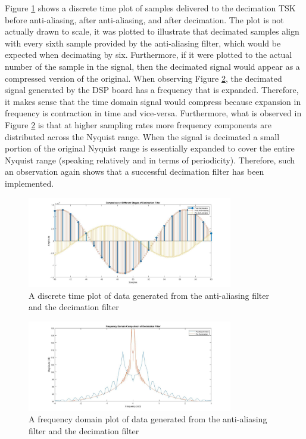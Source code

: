 \documentclass[11pt,pdftex,portrait,letterpaper]{article}
\begin{document}
Figure \ref{f:fig4} shows a discrete time plot of samples delivered to the decimation TSK before anti-aliasing, after anti-aliasing, and after decimation. The plot is not actually drawn to scale, it was plotted to illustrate that decimated samples align with every sixth sample provided by the anti-aliasing filter, which would be expected when decimating by six. Furthermore, if it were plotted to the actual number of the sample in the signal, then the decimated signal would appear as a compressed version of the original. When observing Figure \ref{f:fig5}, the decimated signal generated by the DSP board has a frequency that is expanded. Therefore, it makes sense that the time domain signal would compress because expansion in frequency is contraction in time and vice-versa. Furthermore, what is observed in Figure \ref{f:fig5} is that at higher sampling rates more frequency components are distributed across the Nyquist range. When the signal is decimated a small portion of the original Nyquist range is essentially expanded to cover the entire Nyquist range (speaking relatively and in terms of periodicity). Therefore, such an observation again shows that a successful decimation filter has been implemented. 

\begin{figure}[h]
\centering
\includegraphics[width=0.8\textwidth]{./decimation}
\caption{A discrete time plot of data generated from the anti-aliasing filter and the decimation filter }
\label{f:fig4}
\end{figure}

\begin{figure}[h]
\centering
\includegraphics[width=0.8\textwidth]{./freqDec}
\caption{A frequency domain plot of data generated from the anti-aliasing filter and the decimation filter }
\label{f:fig5}
\end{figure}
\end{document}
